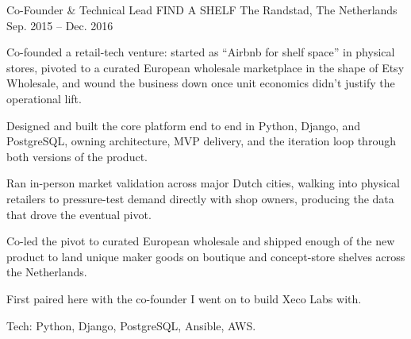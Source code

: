 \begin{cventries}
  \cventry
    {Co-Founder \& Technical Lead} %
    {FIND A SHELF} %
    {The Randstad, The Netherlands} %
    {Sep. 2015 -- Dec. 2016} %
    {
      \begin{cvitems} %
        \item {Co-founded a retail-tech venture: started as ``Airbnb for shelf space'' in physical stores, pivoted to a curated European wholesale marketplace in the shape of Etsy Wholesale, and wound the business down once unit economics didn't justify the operational lift.}
        \item {Designed and built the core platform end to end in Python, Django, and PostgreSQL, owning architecture, MVP delivery, and the iteration loop through both versions of the product.}
        \item {Ran in-person market validation across major Dutch cities, walking into physical retailers to pressure-test demand directly with shop owners, producing the data that drove the eventual pivot.}
        \item {Co-led the pivot to curated European wholesale and shipped enough of the new product to land unique maker goods on boutique and concept-store shelves across the Netherlands.}
        \item {First paired here with the co-founder I went on to build Xeco Labs with.}
        \item {Tech: Python, Django, PostgreSQL, Ansible, AWS.}
      \end{cvitems}
    }


\end{cventries}
